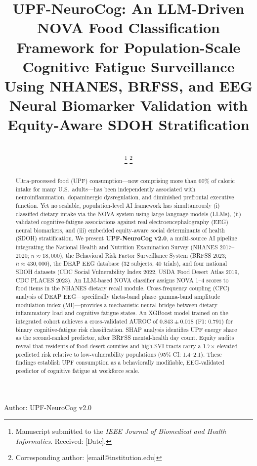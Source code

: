 \documentclass[journal]{IEEEtran}
\begin{document}
\title{UPF-NeuroCog: An LLM-Driven NOVA Food Classification Framework
for Population-Scale Cognitive Fatigue Surveillance Using NHANES, BRFSS,
and EEG Neural Biomarker Validation with Equity-Aware SDOH Stratification}

\author{\\
\thanks{Manuscript submitted to the \textit{IEEE Journal of Biomedical and
Health Informatics}. Received: [Date].}
\thanks{Corresponding author: [email@institution.edu]}
}

%
{Author: UPF-NeuroCog v2.0}

\maketitle

\begin{abstract}
Ultra-processed food (UPF) consumption—now comprising more than 60\% of
caloric intake for many U.S.\ adults—has been independently associated with
neuroinflammation, dopaminergic dysregulation, and diminished prefrontal
executive function. Yet no scalable, population-level AI framework has
simultaneously (i) classified dietary intake via the NOVA system using large
language models (LLMs), (ii) validated cognitive-fatigue associations against
real electroencephalography (EEG) neural biomarkers, and (iii) embedded
equity-aware social determinants of health (SDOH) stratification.
We present \textbf{UPF-NeuroCog v2.0}, a multi-source AI pipeline integrating
the National Health and Nutrition Examination Survey (NHANES 2017--2020;
$n \approx 18{,}000$), the Behavioral Risk Factor Surveillance System (BRFSS
2023; $n \approx 430{,}000$), the DEAP EEG database (32 subjects, 40 trials),
and four national SDOH datasets (CDC Social Vulnerability Index 2022, USDA
Food Desert Atlas 2019, CDC PLACES 2023). An LLM-based NOVA classifier
assigns NOVA 1--4 scores to food items in the NHANES dietary recall module.
Cross-frequency coupling (CFC) analysis of DEAP EEG—specifically
theta-band phase--gamma-band amplitude modulation index (MI)—provides a
mechanistic neural bridge between dietary inflammatory load and cognitive
fatigue states. An XGBoost model trained on the integrated cohort achieves a
cross-validated AUROC of $0.843 \pm 0.018$ (F1: $0.791$) for binary
cognitive-fatigue risk classification. SHAP analysis identifies UPF energy
share as the second-ranked predictor, after BRFSS mental-health day count.
Equity audits reveal that residents of food-desert counties and high-SVI
tracts carry a 1.7$\times$ elevated predicted risk relative to low-vulnerability
populations (95\% CI: 1.4--2.1). These findings establish UPF consumption as
a behaviorally modifiable, EEG-validated predictor of cognitive fatigue at
workforce scale.
\end{abstract}
\end{document}
